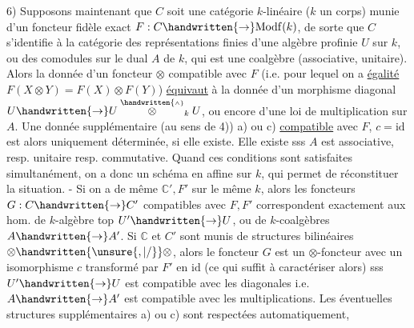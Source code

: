
6) Supposons maintenant que $C$ soit une catégorie  $k$-linéaire ($k$ un corps) munie d'un foncteur fidèle exact $F:C\handwritten{\to}\mathrm{Modf}(k)$, de sorte que $C$ s'identifie à la catégorie des représentations  finies d'une algèbre profinie $U$ sur $k$, ou des comodules sur le dual $A$ de $k$, qui est une coalgèbre (associative, unitaire). Alors la donnée d'un foncteur $\otimes$ compatible avec $F$ (i.e. pour lequel  on a \uline{égalité} $F(X\otimes Y)=F(X)\otimes F(Y)$) \uline{équivaut} à la donnée d'un morphisme diagonal $U\handwritten{\to}U\overset{\handwritten{\scriptscriptstyle\wedge}}{\otimes}_k U$, ou encore d'une loi de multiplication sur $A$. Une donnée supplémentaire (au sens de 4)) a)  ou c) \uline{compatible} avec $F$, $c=\mathrm{id}$ est alors uniquement déterminée, si elle existe. Elle existe sss $A$ est associative, resp. unitaire resp. commutative. Quand ces conditions sont satisfaites simultanément, on a donc un schéma en  affine sur $k$, qui permet de réconstituer la situation. - Si on a de même $\mathbb{C}',F'$ sur le même $k$,  alors les foncteurs $G:C\handwritten{\to} C'$ compatibles avec $F,F'$ correspondent exactement aux hom. de $k$-algèbre top $U'\handwritten{\to}U$, ou de $k$-coalgèbres $A\handwritten{\to}A'$. Si $\mathbb{C}$ et $C'$ sont munis de structures bilinéaires $\otimes\handwritten{\unsure{,|/}}\otimes$, alors le foncteur $G$ est un $\otimes$-foncteur avec un isomorphisme $c$ transformé par $F'$ en $\mathrm{id}$ (ce qui suffit à  caractériser alors) sss $U'\handwritten{\to}U$ est compatible avec les diagonales i.e. $A\handwritten{\to}A'$ est compatible avec les multiplications. Les éventuelles structures supplémentaires a)  ou c) sont respectées automatiquement,


